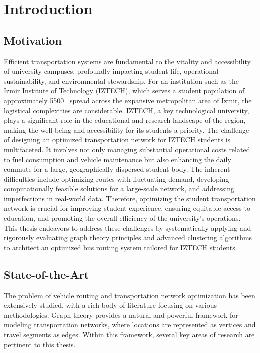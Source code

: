 \chapter{Introduction}
\label{ch:introduction}

\section{Motivation}
\label{sec:intro_motivation}
Efficient transportation systems are fundamental to the vitality and accessibility of university campuses, profoundly impacting student life, operational sustainability, and environmental stewardship. For an institution such as the Izmir Institute of Technology (IZTECH), which serves a student population of approximately 5500~\cite{iztech_info} spread across the expansive metropolitan area of Izmir, the logistical complexities are considerable. IZTECH, a key technological university, plays a significant role in the educational and research landscape of the region, making the well-being and accessibility for its students a priority. The challenge of designing an optimized transportation network for IZTECH students is multifaceted. It involves not only managing substantial operational costs related to fuel consumption and vehicle maintenance but also enhancing the daily commute for a large, geographically dispersed student body. The inherent difficulties include optimizing routes with fluctuating demand, developing computationally feasible solutions for a large-scale network, and addressing imperfections in real-world data. Therefore, optimizing the student transportation network is crucial for improving student experience, ensuring equitable access to education, and promoting the overall efficiency of the university's operations. This thesis endeavors to address these challenges by systematically applying and rigorously evaluating graph theory principles and advanced clustering algorithms to architect an optimized bus routing system tailored for IZTECH students.

\section{State-of-the-Art}
\label{sec:intro_sota}
The problem of vehicle routing and transportation network optimization has been extensively studied, with a rich body of literature focusing on various methodologies. Graph theory provides a natural and powerful framework for modeling transportation networks, where locations are represented as vertices and travel segments as edges. Within this framework, several key areas of research are pertinent to this thesis.

